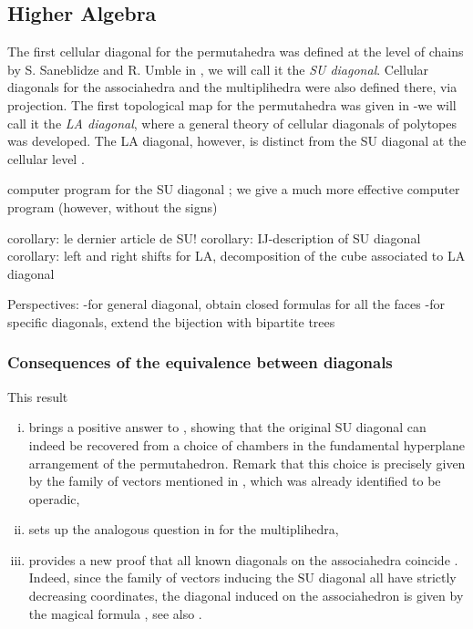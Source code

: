 \documentclass{amsart}
\theoremstyle{definition}
\newcommand{\SU}{\mathrm{SU}}
\begin{document}

\subsection*{Higher Algebra}

The first cellular diagonal for the permutahedra was defined at the level of chains by S. Saneblidze and R. Umble in \cite{SaneblidzeUmble04}, we will call it the \emph{SU diagonal}. 
Cellular diagonals for the associahedra and the multiplihedra were also defined there, via projection. 
The first topological map for the permutahedra was given in \cite{LA21} -we will call it the \emph{LA diagonal}, where a general theory of cellular diagonals of polytopes was developed. 
The LA diagonal, however, is distinct from the SU diagonal at the cellular level \cite[Rem.~3.19]{LA21}. 

computer program for the SU diagonal \cite{vejdemo-johanssonEnumeratingSaneblidzeUmbleDiagonal2007}; we give a much more effective computer program (however, without the signs)

corollary: le dernier article de SU!
corollary: IJ-description of SU diagonal
corollary: left and right shifts for LA, decomposition of the cube associated to LA diagonal

Perspectives: 
-for general diagonal, obtain closed formulas for all the faces
-for specific diagonals, extend the bijection with bipartite trees

\subsubsection{Consequences of the equivalence between diagonals}


This result
\begin{enumerate}[i)]
    \item brings a positive answer to \cite[Rem.~2.19]{LA21}, showing that the original $\SU$ diagonal can indeed be recovered from a choice of chambers in the fundamental hyperplane arrangement of the permutahedron. 
    Remark that this choice is precisely given by the family of vectors mentioned in \cite[Rem.~4.19]{LA21}, which was already identified to be operadic,
    \item sets up the analogous question in \cite[Rem.~3.9]{MazuirLA22} for the multiplihedra,
    \item provides a new proof that all known diagonals on the associahedra coincide \cite{saneblidzeComparingDiagonalsAssociahedra2022}.
    Indeed, since the family of vectors inducing the $\SU$ diagonal all have strictly decreasing coordinates, the diagonal induced on the associahedron is given by the magical formula \cite[Thm.~2]{masudaDiagonalAssociahedra2021}, see also \cite[Prop.~3.8]{LA21}.
\end{enumerate}
\end{document}
